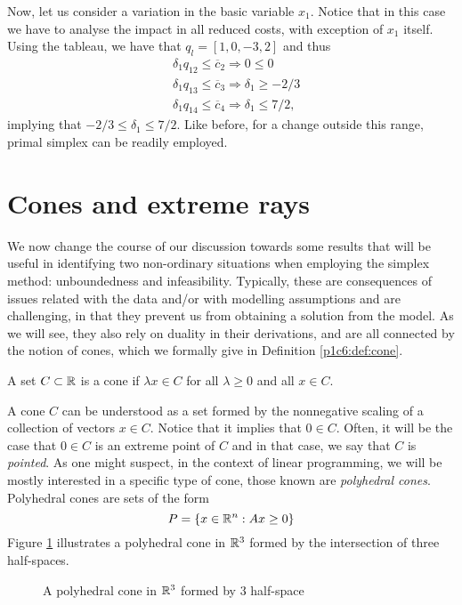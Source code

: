 Now, let us consider a variation in the basic variable $x_1$. Notice that in this case we have to analyse the impact in all reduced costs, with exception of $x_1$ itself. Using the tableau, we have that $q_l = [1, 0, -3, 2]$ and thus
%
\begin{align*}
	& \delta_1 q_{12} \leq \overline{c}_2 \Rightarrow 0 \leq 0 \\
	& \delta_1 q_{13} \leq \overline{c}_3 \Rightarrow \delta_1 \geq -2/3  \\
	& \delta_1 q_{14} \leq \overline{c}_4 \Rightarrow \delta_1 \leq 7/2, 
\end{align*}
%
implying that $-2/3 \leq \delta_1 \leq 7/2$. Like before, for a change outside this range, primal simplex can be readily employed.


\section{Cones and extreme rays}

We now change the course of our discussion towards some results that will be useful in identifying two non-ordinary situations when employing the simplex method: unboundedness and infeasibility. Typically, these are consequences of issues related with the data and/or with modelling assumptions and are challenging, in that they prevent us from obtaining a solution from the model. As we will see, they also rely on duality in their derivations, and are all connected by the notion of cones, which we formally give in Definition \ref{p1c6:def:cone}.

\begin{definition}[Cones]\label{p1c6:def:cone}
	A set $C \subset \mathbb{R}$ is a cone if $\lambda x \in C$ for all $\lambda \geq 0$ and all $x \in C$.	
\end{definition}

A cone $C$ can be understood as a set formed by the nonnegative scaling  of a collection of vectors $x \in C$. Notice that it implies that $ 0 \in C$. Often, it will be the case that $ 0 \in C$ is an extreme point of $C$ and in that case, we say that $C$ is \emph{pointed}. As one might suspect, in the context of linear programming, we will be mostly interested in a specific type of cone, those known are \emph{polyhedral cones}. Polyhedral cones are sets of the form 
%
\begin{equation*}
	P = \left\{ x \in \mathbb{R}^n : Ax \geq 0 \right \}
\end{equation*}
%
Figure \ref{p1c6:fig:poly_cone} illustrates a polyhedral cone in $\mathbb{R}^3$ formed by the intersection of three half-spaces. 
%
\begin{figure}[h]
	\caption{A polyhedral cone in $\mathbb{R}^3$ formed by 3 half-space} \label{p1c6:fig:poly_cone}
\end{figure}
%

